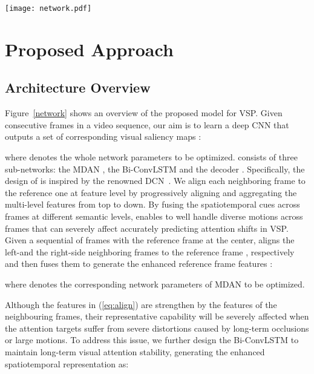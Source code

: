 \documentclass[review]{elsarticle}
\begin{document}
\begin{figure*}[t]
\centering
\texttt{[image: network.pdf]}
\caption{Overview of the proposed VSP framework. Firstly, a sequence of video frames are fed into the MDAN to align the reference and its neighboring frames, yielding the aligned features that can well capture short-term spatiotemporal information. Then, the aligned features are sent to the Bi-ConvLSTM, generating the features that encodes long-term spatiotemporal information. Finally, the output features are decoded to generate the predicted saliency map.}
\label{network}
\end{figure*}
\section{Proposed Approach}

\subsection{Architecture Overview}\label{sec:overview}
Figure~\ref{network} shows an overview of the proposed model for VSP.
Given  consecutive frames  in a video sequence, our aim is to learn a deep CNN  that outputs a set of corresponding visual saliency maps :

where  denotes the whole network parameters to be optimized.
 consists of three sub-networks: the MDAN , the Bi-ConvLSTM  and the decoder .
Specifically, the design of  is inspired by the renowned DCN~\cite{dai2017deformable,zhu2019deformable}. We align each neighboring frame to the reference one at feature level by progressively aligning and aggregating the multi-level features from top to down.
By fusing the spatiotemporal cues across frames at different semantic levels,  enables to well handle diverse motions across frames that can severely affect accurately predicting attention shifts in VSP.
Given a sequential of  frames with the reference frame  at the center,  aligns the left-and the right-side  neighboring frames to the reference frame , respectively and then fuses them to generate the enhanced reference frame features :

where  denotes the corresponding network parameters of MDAN to be optimized.


Although the features  in (\ref{eq:align}) are strengthen by the features of the neighbouring frames, their representative capability will be severely affected when the attention targets suffer from severe distortions caused by long-term occlusions or large motions.
To address this issue, we further design the Bi-ConvLSTM  to maintain long-term visual attention stability, generating the enhanced spatiotemporal representation as:
\end{document}
